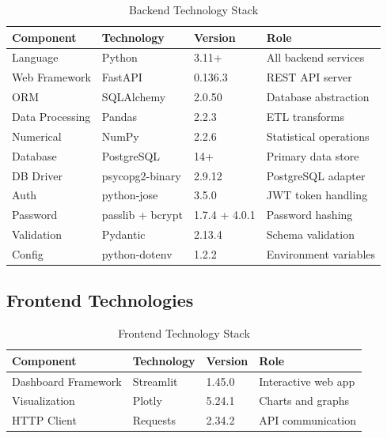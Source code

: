 \documentclass[12pt, a4paper]{report}
\begin{document}
\begin{table}[H]
\centering
\caption{Backend Technology Stack}
\label{tab:backend_stack}
\begin{tabular}{@{}llll@{}}
\toprule
\textbf{Component} & \textbf{Technology} & \textbf{Version} & \textbf{Role} \\
\midrule
Language         & Python          & 3.11+    & All backend services \\
Web Framework    & FastAPI         & 0.136.3  & REST API server \\
ORM              & SQLAlchemy      & 2.0.50   & Database abstraction \\
Data Processing  & Pandas          & 2.2.3    & ETL transforms \\
Numerical        & NumPy           & 2.2.6    & Statistical operations \\
Database         & PostgreSQL      & 14+      & Primary data store \\
DB Driver        & psycopg2-binary & 2.9.12   & PostgreSQL adapter \\
Auth             & python-jose     & 3.5.0    & JWT token handling \\
Password         & passlib + bcrypt & 1.7.4 + 4.0.1 & Password hashing \\
Validation       & Pydantic        & 2.13.4   & Schema validation \\
Config           & python-dotenv   & 1.2.2    & Environment variables \\
\bottomrule
\end{tabular}
\end{table}

\subsection{Frontend Technologies}

\begin{table}[H]
\centering
\caption{Frontend Technology Stack}
\label{tab:frontend_stack}
\begin{tabular}{@{}llll@{}}
\toprule
\textbf{Component} & \textbf{Technology} & \textbf{Version} & \textbf{Role} \\
\midrule
Dashboard Framework & Streamlit  & 1.45.0 & Interactive web app \\
Visualization       & Plotly     & 5.24.1 & Charts and graphs \\
HTTP Client         & Requests   & 2.34.2 & API communication \\
\bottomrule
\end{tabular}
\end{table}
\end{document}

